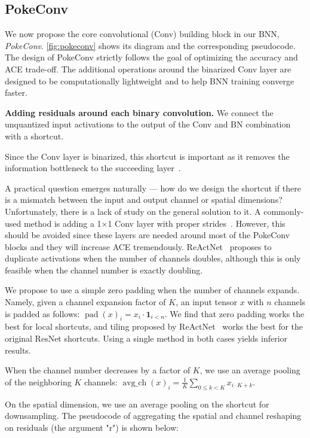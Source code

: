 \subsection{PokeConv}
\label{sec:pokeconv}

We now propose the core convolutional (Conv) building block in our BNN, \textit{PokeConv}.
\ref{fig:pokeconv} shows its diagram and the corresponding pseudocode. The design of PokeConv strictly follows the goal of optimizing the accuracy and ACE trade-off. The additional operations around the binarized Conv layer are designed to be computationally lightweight and to help BNN training converge faster.

\textbf{Adding residuals around each binary convolution.} We connect the unquantized input activations to the output of the Conv and BN combination with a shortcut.

Since the Conv layer is binarized, this shortcut is important as it removes the information bottleneck to the succeeding layer~\cite{Liu2018bireal}.

A practical question emerges naturally --- how do we design the shortcut if there is a mismatch between the input and output channel or spatial dimensions? Unfortunately, there is a lack of study on the general solution to it. A commonly-used method is adding a 1$\times$1 Conv layer with proper strides~\cite{He2016resnet}. However, this should be avoided since these layers are needed around most of the PokeConv blocks and they will increase ACE tremendously. ReActNet~\cite{Liu2020reactnet} proposes to duplicate activations when the number of channels doubles, although this is only feasible when the channel number is exactly doubling.

We propose to use a simple zero padding when the number of channels expands. Namely, given a channel expansion factor of $K$, an input tensor $x$ with $n$ channels is padded as follows:
$\operatorname{pad}(x)_i = x_i \cdot \mathbf{1}_{i < n}$. We find that zero padding works the best for local shortcuts, and tiling proposed by ReActNet~\cite{Liu2020reactnet} works the best for the original ResNet shortcuts. Using a single method in both cases yields inferior results.

When the channel number decreases by a factor of $K$, we use an average pooling of the neighboring $K$ channels:
$\operatorname{avg\_ch}(x)_i = \frac{1}{K} \sum_{0\leq k < K} x_{i\cdot K + k}$.

On the spatial dimension, we use an average pooling on the shortcut for downsampling. The pseudocode of aggregating the spatial and channel reshaping on residuals (the argument "r") is shown below:

